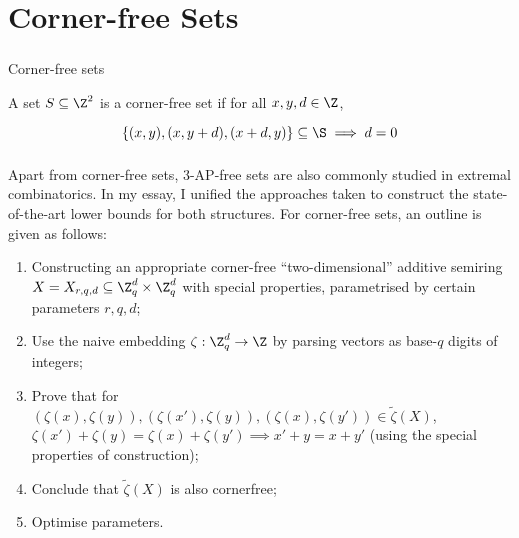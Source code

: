 
\section{Corner-free Sets}

\begin{frame}\frametitle{\insertsubsection}

\begin{block}{Corner-free sets}

  A set \(S \subseteq \Z^2\) is a corner-free set if for all \(x, y, d \in \Z\),

\[
  \{(x, y), (x, y + d), (x + d, y)\} \subseteq \S \implies d = 0
\]

\end{block}

\end{frame}


\begin{frame}\frametitle{\insertsubsection}

Apart from corner-free sets, \(3\)-AP-free sets are also commonly studied in extremal combinatorics. In my essay, I unified the approaches taken to construct the state-of-the-art lower bounds for both structures. For corner-free sets, an outline is given as follows:

\begin{enumerate}
  \item Constructing an appropriate corner-free ``two-dimensional'' additive semiring \(X = X_{r, q, d} \subseteq \Z_q^d \times \Z_q^d\) with special properties, parametrised by certain parameters \(r, q, d\);
  \item Use the naive embedding \(\zeta : \Z_q^d \to \Z\) by parsing vectors as base-\(q\) digits of integers;
  \item Prove that for \((\zeta(x), \zeta(y)), (\zeta(x'), \zeta(y)), (\zeta(x), \zeta(y')) \in \widetilde{\zeta}(X)\), \(\zeta(x') + \zeta(y) = \zeta(x) + \zeta(y') \implies x' + y = x + y'\) (using the special properties of construction);
  \item Conclude that \(\widetilde{\zeta}(X)\) is also cornerfree;
  \item Optimise parameters.
\end{enumerate}

\end{frame}
